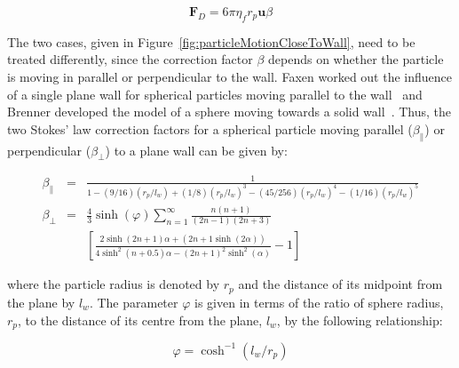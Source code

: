 \begin{equation}
	\mathbf{F}_{D} = 6\pi\eta_{f} r_{p} \mathbf{u} \beta
	\label{eqn:wallEffectCorrectedDragForce}
\end{equation}

The two cases, given in Figure~\ref{fig:particleMotionCloseToWall}, need to be treated differently, since the correction factor $\beta$ depends on whether the particle is moving in parallel or perpendicular to the wall. Faxen worked out the influence of a single plane wall for spherical particles moving parallel to the wall~\cite{Faxen1922} and Brenner developed the model of a sphere moving towards a solid wall~\cite{Brenner1961}. Thus, the two Stokes' law correction factors for a spherical particle moving parallel ($\beta_{\parallel}$) or perpendicular ($\beta_{\perp}$) to a plane wall can be given by:

\begin{eqnarray}
	\beta_{\parallel} &=& \frac{1}{1-(9/16)(r_{p}/l_{w})+(1/8)(r_{p}/l_{w})^{3}-(45/256)(r_{p}/l_{w})^{4}-(1/16)(r_{p}/l_{w})^{5}} \\
	\beta_{\perp} &=& \frac{4}{3} \sinh(\varphi) \sum_{n=1}^{\infty} \frac{n(n+1)}{(2n-1)(2n+3)} \\
	 && \left[ \frac{2\sinh(2n+1)\alpha + (2n+1\sinh(2\alpha))}{4\sinh^{2}(n+0.5)\alpha-(2n+1)^{2}\sinh^{2}(\alpha)} -1\right] \nonumber
	\label{eqn:wallEffectCorrectionFactors}
\end{eqnarray}

where the particle radius is denoted by $r_{p}$ and the distance of its midpoint from the plane by $l_{w}$. The parameter $\varphi$ is given in terms of the ratio of sphere radius, $r_{p}$, to the distance of its centre from the plane, $l_{w}$, by the following relationship:

\begin{equation}
 	 \varphi = \cosh^{-1}(l_{w}/r_{p})
 	 \label{eqn:radiusToDistanceToPlane}
\end{equation}

